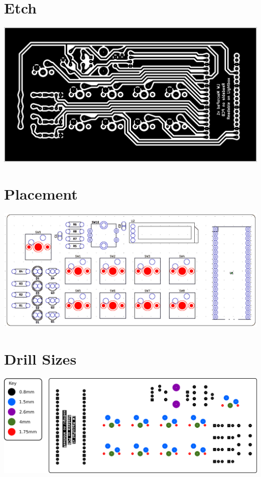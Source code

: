 \section{Etch}
\label{sec:etch}
\includegraphics[width=\textwidth]{img/macropad-rev1-B_Cu_Oversized.png}

\section{Placement}
\label{sec:placement}
\includegraphics[width=\textwidth]{img/component-layout.png}


\section{Drill Sizes}
\label{sec:drillsizes}
\includegraphics[width=\textheight,angle=90]{img/hole-colours.png}


